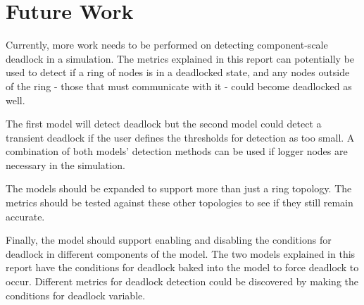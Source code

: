 \documentclass{article}
\begin{document}



\section{Future Work}
Currently, more work needs to be performed on detecting component-scale deadlock in a simulation. The metrics explained in this report can potentially be used to detect if a ring of nodes is in a deadlocked state, and any nodes outside of the ring - those that must communicate with it - could become deadlocked as well.

The first model will detect deadlock but the second model could detect a transient deadlock if the user defines the thresholds for detection as too small. A combination of both models' detection methods can be used if logger nodes are necessary in the simulation.

The models should be expanded to support more than just a ring topology. The metrics should be tested against these other topologies to see if they still remain accurate.

Finally, the model should support enabling and disabling the conditions for deadlock in different components of the model. The two models explained in this report have the conditions for deadlock baked into the model to force deadlock to occur. Different metrics for deadlock detection could be discovered by making the conditions for deadlock variable.



\end{document}
